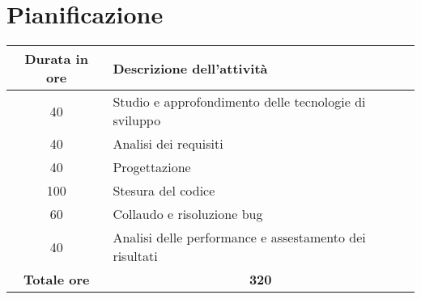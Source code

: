
\section{Pianificazione}\label{sec:pianificazione}
\begin{tabularx}{\textwidth}{|c|X|}
    \hline
    \textbf{Durata in ore} & \textbf{Descrizione dell'attività} \\\hline
    40 & Studio e approfondimento delle tecnologie di sviluppo \\\hline
    40 & Analisi dei requisiti \\\hline
    40 & Progettazione \\\hline
    100 & Stesura del codice \\\hline
    60 & Collaudo e risoluzione bug \\\hline
    40 & Analisi delle performance e assestamento dei risultati \\\hline
    \textbf{Totale ore} & \multicolumn{1}{|c|}{\textbf{320}} \\\hline
\end{tabularx}